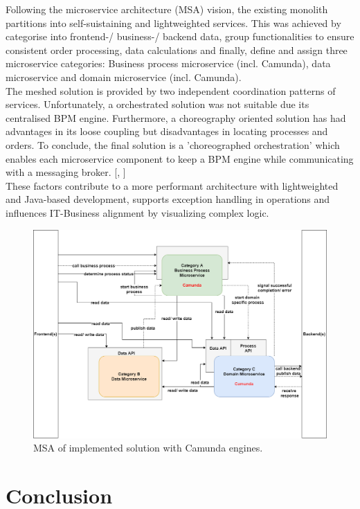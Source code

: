 \newpage
Following the microservice architecture (MSA) vision, the existing monolith partitions into self-suistaining and lightweighted services. This was achieved by categorise into frontend-/ business-/ backend data, group functionalities to ensure consistent order processing, data calculations and finally, define and assign three microservice categories: Business process microservice (incl. Camunda), data microservice and domain microservice (incl. Camunda). \\[1em]
The meshed solution is provided by two independent coordination patterns of services. Unfortunately, a orchestrated solution was not suitable due its centralised BPM engine. Furthermore, a choreography oriented solution has had advantages in its loose coupling but disadvantages in locating processes and orders. To conclude, the final solution is a 'choreographed orchestration' which enables each microservice component to keep a BPM engine while communicating with a messaging broker.
[\cite{CamundaServicesGmbH.May2017}, \cite{FriedbertSamland.}]\\
These factors contribute to a more performant architecture with lightweighted and Java-based development, supports exception handling in operations and influences IT-Business alignment by visualizing complex logic. \\

\begin{figure}[!hb]
	\centering
	\includegraphics[scale=0.4]{CamundaBPMN}
	\caption{MSA of implemented solution with Camunda engines. \cite{FriedbertSamland.}}
\end{figure}


\chapter{Conclusion}

